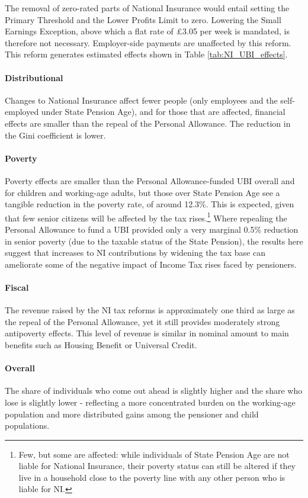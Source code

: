 \documentclass{article}
\begin{document}
    The removal of zero-rated parts of National Insurance would entail setting the Primary Threshold and the Lower Profits Limit to zero. Lowering the Small Earnings Exception, above which a flat rate of £3.05 per week is mandated, is therefore not necessary. Employer-side payments are unaffected by this reform. This reform generates estimated effects shown in Table \ref{tab:NI_UBI_effects}.

    \paragraph{Distributional} Changes to National Insurance affect fewer people (only employees and the self-employed under State Pension Age), and for those that are affected, financial effects are smaller than the repeal of the Personal Allowance. The reduction in the Gini coefficient is lower. 

    \paragraph{Poverty} Poverty effects are smaller than the Personal Allowance-funded UBI overall and for children and working-age adults, but those over State Pension Age see a tangible reduction in the poverty rate, of around 12.3\%. This is expected, given that few senior citizens will be affected by the tax rises.\footnote{Few, but some are affected: while individuals of State Pension Age are not liable for National Insurance, their poverty status can still be altered if they live in a household close to the poverty line with any other person who is liable for NI.} Where repealing the Personal Allowance to fund a UBI provided only a very marginal 0.5\% reduction in senior poverty (due to the taxable status of the State Pension), the results here suggest that increases to NI contributions by widening the tax base can ameliorate some of the negative impact of Income Tax rises faced by pensioners.
    \paragraph{Fiscal} The revenue raised by the NI tax reforms is approximately one third as large as the repeal of the Personal Allowance, yet it still provides moderately strong antipoverty effects. This level of revenue is similar in nominal amount to main benefits such as Housing Benefit or Universal Credit.
    \paragraph{Overall} The share of individuals who come out ahead is slightly higher and the share who lose is slightly lower - reflecting a more concentrated burden on the working-age population and more distributed gains among the pensioner and child populations.
\end{document}
